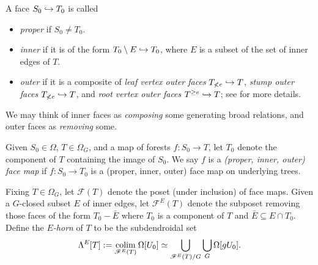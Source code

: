 \documentclass[a4paper,10pt,draft]{article}%
\begin{document}
\begin{definition}
      A face $S_0 \hookrightarrow T_0$ is called
      \begin{itemize}
      \item \textit{proper} if $S_0 \neq T_0$.
      \item \textit{inner} if it is of the form $T_0 \setminus E \hookrightarrow T_0$, where $E$ is a subset of the set of inner edges of $T$.
      \item \textit{outer} if it is a composite of
            \textit{leaf vertex outer faces} $T_{\not< e}\hookrightarrow T$,
            \textit{stump outer faces} $T_{\not< e}\hookrightarrow T$,
            and \textit{root vertex outer faces} $T^{\geq e} \hookrightarrow T$;
            see \cite[Notation 5.41]{Per17} for more details.
      \end{itemize}
\end{definition}

\begin{remark}
      We may think of inner faces as \textit{composing} some generating broad relations,
      and outer faces as \textit{removing} some.
\end{remark}


\begin{definition}
      Given $S_0 \in \Omega$, $T \in \Omega_G$, and a map of forests $f: S_0 \to T$, let
      $T_0$ denote the component of $T$ containing the image of $S_0$.
      We say $f$ is a \textit{(proper, inner, outer) face map} if
      $f: S_0 \to T_0$ is a (proper, inner, outer) face map on underlying trees.
\end{definition}

\begin{definition}
      Fixing $T\in \Omega_G$,
      let $\mathscr{F}(T)$ denote the poset (under inclusion) of face maps.
      Given a $G$-closed subset $E$ of inner edges, let
      $\mathscr{F}^{E}(T)$ denote the subposet removing those faces of the form
      $T_0 - \bar E$
      where $T_0$ is a component of $T$ and $\bar E \subseteq E \cap T_0$.
      Define the \textit{$E$-horn} of $T$ to be the subdendroidal set
      \begin{equation}
            \Lambda^{E}[T]
            := \mathop{\operatorname{colim}}\limits_{\mathscr{F}^E(T)} \Omega[U_0]
            \simeq \mathop{\bigcup}\limits_{\mathscr{F}^E(T)/G}\mathop{\bigcup}\limits_{G}\Omega[g U_0].
      \end{equation}
  \end{definition}
\end{document}
